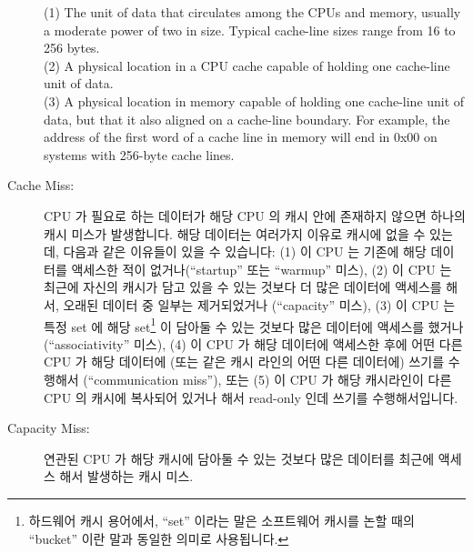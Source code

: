 \begin{description}
	(1) The unit of data that circulates among the CPUs and memory,
	usually a moderate power of two in size.
	Typical cache-line sizes range from 16 to 256 bytes. \\
	(2) A physical location in a CPU cache capable of holding
	one cache-line unit of data. \\
	(3) A physical location in memory capable of holding one
	cache-line unit of data, but that it also aligned
	on a cache-line boundary.
	For example, the address of the first word of a cache line
	in memory will end in 0x00 on systems with 256-byte cache lines.
	\fi
\item[Cache Miss:]
	CPU 가 필요로 하는 데이터가 해당 CPU 의 캐시 안에 존재하지 않으면
	하나의 캐시 미스가 발생합니다.
	해당 데이터는 여러가지 이유로 캐시에 없을 수 있는데, 다음과 같은
	이유들이 있을 수 있습니다:
	(1) 이 CPU 는 기존에 해당 데이터를 액세스한 적이 없거나(``startup''
	또는 ``warmup'' 미스),
	(2) 이 CPU 는 최근에 자신의 캐시가 담고 있을 수 있는 것보다 더 많은
	데이터에 액세스를 해서, 오래된 데이터 중 일부는 제거되었거나
	(``capacity'' 미스),
	(3) 이 CPU 는 특정 set 에 해당 set\footnote{
		하드웨어 캐시 용어에서, ``set'' 이라는 말은 소프트웨어 캐시를
		논할 때의 ``bucket'' 이란 말과 동일한 의미로 사용됩니다.}
	이 담아둘 수 있는 것보다 많은 데이터에 액세스를 했거나
	(``associativity'' 미스),
	(4) 이 CPU 가 해당 데이터에 액세스한 후에 어떤 다른 CPU 가 해당
	데이터에 (또는 같은 캐시 라인의 어떤 다른 데이터에) 쓰기를 수행해서
	(``communication miss''), 또는
	(5) 이 CPU 가 해당 캐시라인이 다른 CPU 의 캐시에 복사되어 있거나 해서
	read-only 인데 쓰기를 수행해서입니다.
	\iffalse

	A cache miss occurs when data needed by the CPU is not in
	that CPU's cache.
	The data might be missing because of a number of reasons,
	including:
	(1) this CPU has never accessed the data before
	(``startup'' or ``warmup'' miss),
	(2) this CPU has recently accessed more
	data than would fit in its cache, so that some of the older
	data had to be removed (``capacity'' miss),
	(3) this CPU
	has recently accessed more data in a given set\footnote{
		In hardware-cache terminology, the word ``set''
		is used in the same way that the word ``bucket''
		is used when discussing software caches.}
	than that set could hold (``associativity'' miss),
	(4) some other CPU has written to the data (or some other
	data in the same cache line) since this CPU has accessed it
	(``communication miss''), or
	(5) this CPU attempted to write to a cache line that is
	currently read-only, possibly due to that line being replicated
	in other CPUs' caches.
	\fi
\item[Capacity Miss:]
	연관된 CPU 가 해당 캐시에 담아둘 수 있는 것보다 많은 데이터를 최근에
	액세스 해서 발생하는 캐시 미스.
	\iffalse


\end{description}

